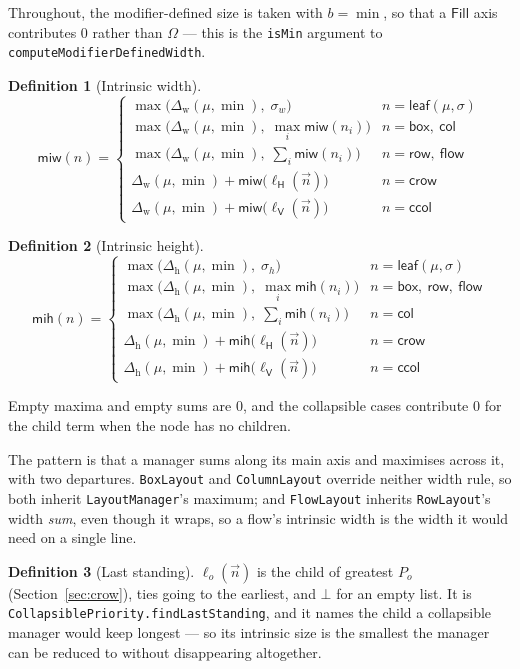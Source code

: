 \documentclass[11pt,a4paper]{article}
\newcommand{\Om}{\Omega}
\newcommand{\bo}{\bot}
\newcommand{\Fill}{\mathsf{Fill}}
\newcommand{\Horz}{\mathsf{H}}
\newcommand{\Vrt}{\mathsf{V}}
\newcommand{\leaf}{\mathsf{leaf}}
\newcommand{\bbox}{\mathsf{box}}
\newcommand{\rrow}{\mathsf{row}}
\newcommand{\ccol}{\mathsf{col}}
\newcommand{\crow}{\mathsf{crow}}
\newcommand{\ccolp}{\mathsf{ccol}}
\newcommand{\fflow}{\mathsf{flow}}
\newcommand{\miw}{\mathsf{miw}}
\newcommand{\mih}{\mathsf{mih}}
\newcommand{\Dw}{\Delta_{\mathrm{w}}}
\newcommand{\Dh}{\Delta_{\mathrm{h}}}
\newcommand{\jv}[1]{\texttt{#1}}       %
\theoremstyle{definition}
\newtheorem{definition}{Definition}[section]
\theoremstyle{plain}
\theoremstyle{remark}
\begin{document}
Throughout, the modifier-defined size is taken with $b = \min$, so that a $\Fill$
axis contributes $0$ rather than $\Om$ --- this is the \jv{isMin} argument to
\jv{computeModifierDefinedWidth}.

\begin{definition}[Intrinsic width]
\[
  \miw(n) = \begin{cases}
    \max\bigl(\Dw(\mu,\min),\; \sigma_w\bigr)
      & n = \leaf(\mu, \sigma) \\[2pt]
    \max\bigl(\Dw(\mu,\min),\; \max_i \miw(n_i)\bigr)
      & n = \bbox,\ \ccol \\[2pt]
    \max\bigl(\Dw(\mu,\min),\; \sum_i \miw(n_i)\bigr)
      & n = \rrow,\ \fflow \\[2pt]
    \Dw(\mu,\min) + \miw\bigl(\ell_{\Horz}(\vec{n})\bigr)
      & n = \crow \\[2pt]
    \Dw(\mu,\min) + \miw\bigl(\ell_{\Vrt}(\vec{n})\bigr)
      & n = \ccolp
  \end{cases}
\]
\end{definition}

\begin{definition}[Intrinsic height]
\[
  \mih(n) = \begin{cases}
    \max\bigl(\Dh(\mu,\min),\; \sigma_h\bigr)
      & n = \leaf(\mu, \sigma) \\[2pt]
    \max\bigl(\Dh(\mu,\min),\; \max_i \mih(n_i)\bigr)
      & n = \bbox,\ \rrow,\ \fflow \\[2pt]
    \max\bigl(\Dh(\mu,\min),\; \sum_i \mih(n_i)\bigr)
      & n = \ccol \\[2pt]
    \Dh(\mu,\min) + \mih\bigl(\ell_{\Horz}(\vec{n})\bigr)
      & n = \crow \\[2pt]
    \Dh(\mu,\min) + \mih\bigl(\ell_{\Vrt}(\vec{n})\bigr)
      & n = \ccolp
  \end{cases}
\]
\end{definition}

Empty maxima and empty sums are $0$, and the collapsible cases contribute $0$ for
the child term when the node has no children.

The pattern is that a manager sums along its main axis and maximises across it,
with two departures. \jv{BoxLayout} and \jv{ColumnLayout} override neither width
rule, so both inherit \jv{LayoutManager}'s maximum; and \jv{FlowLayout} inherits
\jv{RowLayout}'s width \emph{sum}, even though it wraps, so a flow's intrinsic
width is the width it would need on a single line.

\begin{definition}[Last standing]
$\ell_o(\vec{n})$ is the child of greatest $P_o$ (Section~\ref{sec:crow}), ties
going to the earliest, and $\bo$ for an empty list. It is
\jv{CollapsiblePriority.findLastStanding}, and it names the child a collapsible
manager would keep longest --- so its intrinsic size is the smallest the manager
can be reduced to without disappearing altogether.
\end{definition}
\end{document}
